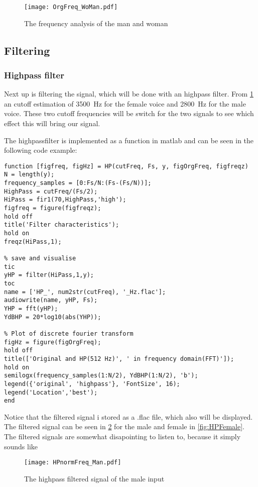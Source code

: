 \begin{figure}[h]
\centering
\texttt{[image: OrgFreq\_WoMan.pdf]}
\caption{The frequency analysis of the man and woman}
\label{fig:WoManFFT}
\end{figure}


\subsection{Filtering}

\subsubsection{Highpass filter}
Next up is filtering the signal, which will be done with an highpass filter. From \cref{fig:WoManFFT} an cutoff estimation of \SI{3500}{\hertz} for the female voice and \SI{2800}{\hertz} for the male voice. These two cutoff frequencies will be switch for the two signals to see which effect this will bring our signal.

The highpassfilter is implemented as a function in matlab and can be seen in the following code example:

\begin{verbatim}
function [figfreq, figHz] = HP(cutFreq, Fs, y, figOrgFreq, figfreqz)
N = length(y);
frequency_samples = [0:Fs/N:(Fs-(Fs/N))];
HighPass = cutFreq/(Fs/2);
HiPass = fir1(70,HighPass,'high');
figfreq = figure(figfreqz);
hold off
title('Filter characteristics');
hold on
freqz(HiPass,1);

% save and visualise 
tic
yHP = filter(HiPass,1,y);
toc
name = ['HP_', num2str(cutFreq), '_Hz.flac'];
audiowrite(name, yHP, Fs);
YHP = fft(yHP);
YdBHP = 20*log10(abs(YHP));

% Plot of discrete fourier transform
figHz = figure(figOrgFreq);
hold off
title(['Original and HP(512 Hz)', ' in frequency domain(FFT)']);
hold on
semilogx(frequency_samples(1:N/2), YdBHP(1:N/2), 'b');
legend({'original', 'highpass'}, 'FontSize', 16);
legend('Location','best');
end
\end{verbatim}


Notice that the filtered signal i stored as a .flac file, which also will be displayed. The filtered signal can be seen in \cref{fig:HPMAle} for the male and female in \cref{fig:HPFemale}. The filtered signals are somewhat disapointing to listen to, because it simply sounds like 

\begin{figure}[h]
\centering
\texttt{[image: HPnormFreq\_Man.pdf]}
\caption{The highpass filtered signal of the male input}
\label{fig:HPMAle}
\end{figure}

